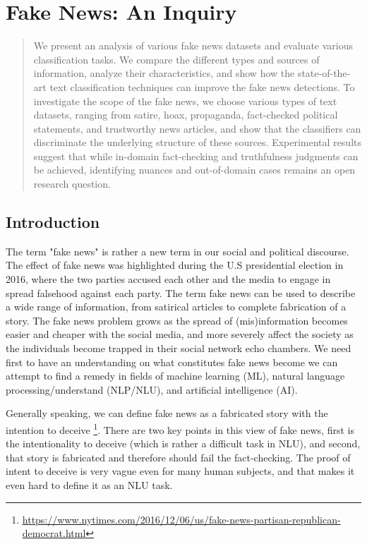 \chapter{Fake News: An Inquiry}

\begin{abstract}
We present an analysis of various fake news datasets and evaluate various classification tasks. We compare the different types and sources of information, analyze their characteristics, and show how the state-of-the-art text classification techniques can improve the fake news detections. To investigate the scope of the fake news, we choose various types of text datasets, ranging from satire, hoax, propaganda, fact-checked political statements, and trustworthy news articles, and show that the classifiers can discriminate the underlying structure of these sources. Experimental results suggest that while in-domain fact-checking and truthfulness judgments can be achieved, identifying nuances and out-of-domain cases remains an open research question.
\end{abstract}

\section{Introduction}
The term "fake news" is rather a new term in our social and political discourse. The effect of fake news was highlighted during the U.S presidential election in 2016, where the two parties accused each other and the media to engage in spread falsehood against each party. The term fake news can be used to describe a wide range of information, from satirical articles to complete fabrication of a story. The fake news problem grows as the spread of (mis)information becomes easier and cheaper with the social media, and more severely affect the society as the individuals become trapped in their social network echo chambers. We need first to have an understanding on what constitutes fake news become we can attempt to find a remedy in fields of machine learning (ML), natural language processing/understand (NLP/NLU), and artificial intelligence (AI). 

Generally speaking, we can define fake news as a fabricated story with the intention to deceive \footnote{\url{https://www.nytimes.com/2016/12/06/us/fake-news-partisan-republican-democrat.html}}. There are two key points in this view of fake news, first is the intentionality to deceive (which is rather a difficult task in NLU), and second, that story is fabricated and therefore should fail the fact-checking. The proof of intent to deceive is very vague even for many human subjects, and that makes it even hard to define it as an NLU task. 

